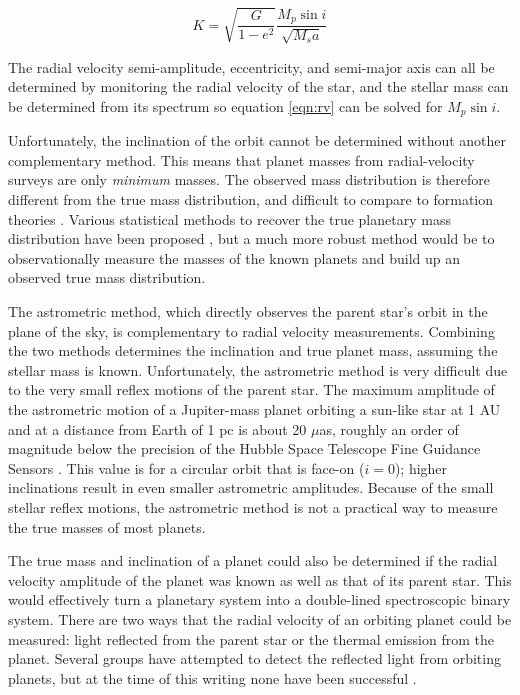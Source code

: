 \documentclass[11pt]{report}     %
\begin{document}
\begin{equation}
K = \sqrt{\frac{G}{1-e^2}} \frac{M_p \sin{i}}{\sqrt{M_sa}}
\label{eqn:rv}
\end{equation}

The radial velocity semi-amplitude, eccentricity, and semi-major axis
can all be determined by monitoring the radial velocity of the star,
and the stellar mass can be determined from its spectrum
so equation \ref{eqn:rv} can be solved for $M_p \sin{i}$. 

Unfortunately, the inclination of the orbit cannot be determined
without another complementary method. This means that planet masses from
radial-velocity surveys are only \emph{minimum} masses. The observed mass
distribution is therefore different from the true mass
distribution, and difficult to compare to formation theories
\citep[see e.g.][]{Ida2005, Mordasini2009}. Various statistical methods to recover the true
planetary mass distribution have been proposed \citep[see][and
references therein]{Lopez2012}, but a much more robust method would be
to observationally measure the masses of the known planets and build
up an observed true mass distribution. 

The astrometric method, which directly observes the parent star's orbit
in the plane of the sky, is complementary to radial velocity
measurements. Combining the two methods determines the inclination and
true planet mass, assuming the stellar mass is known. Unfortunately,
the astrometric method is very difficult due to the very small reflex
motions of the parent star. The maximum amplitude of the astrometric
motion of a Jupiter-mass planet orbiting a
sun-like star at 1 AU and at a distance from Earth of 1 pc is about 20
$\mu$as,  roughly an order of magnitude below the
precision of the Hubble Space Telescope Fine Guidance Sensors
\citep{Benedict2006}. This value is for a circular orbit that is
face-on ($i = 0$); higher inclinations result in even smaller
astrometric amplitudes. Because of the small stellar reflex motions,
the astrometric method is not a practical way to measure the true
masses of most planets. 

The true mass and inclination of a planet could also be determined if the
radial velocity amplitude of the planet was known as well as that of its parent
star. This would effectively turn a planetary system into a
double-lined spectroscopic binary system. There are two ways that the
radial velocity of an orbiting planet could be measured: light
reflected from the parent star or the thermal emission from the planet. Several groups have
attempted to detect the reflected light from orbiting planets, but at
the time of this writing none have been successful \citep{Collier2002,
  Rodler2008, Rodler2010, Langford2011}. 
\end{document}
